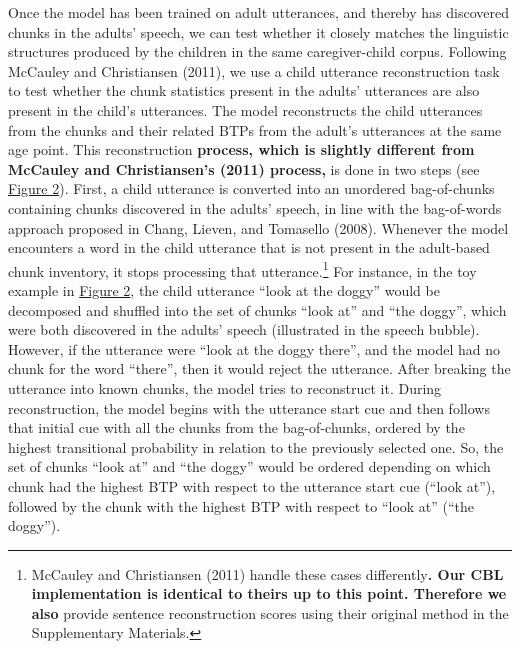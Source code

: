 \documentclass[man,mask,floatsintext]{apa6}
\let\rmarkdownfootnote\footnote%
\def\footnote{\protect\rmarkdownfootnote}
\begin{document}
Once the model has been trained on adult utterances, and thereby has
discovered chunks in the adults' speech, we can test whether it closely
matches the linguistic structures produced by the children in the same
caregiver-child corpus. Following McCauley and Christiansen (2011), we
use a child utterance reconstruction task to test whether the chunk
statistics present in the adults' utterances are also present in the
child's utterances. The model reconstructs the child utterances from the
chunks and their related BTPs from the adult's utterances at the same
age point. This reconstruction \textbf{process, which is slightly
different from McCauley and Christiansen's (2011) process,} is done in
two steps (see \protect\hyperlink{fig2}{Figure 2}). First, a child
utterance is converted into an unordered bag-of-chunks containing chunks
discovered in the adults' speech, in line with the bag-of-words approach
proposed in Chang, Lieven, and Tomasello (2008). Whenever the model
encounters a word in the child utterance that is not present in the
adult-based chunk inventory, it stops processing that
utterance.\footnote{McCauley and Christiansen (2011) handle these cases
  differently\textbf{. Our CBL implementation is identical to theirs up
  to this point. Therefore we also} provide sentence reconstruction
  scores using their original method in the Supplementary Materials.}
For instance, in the toy example in \protect\hyperlink{fig2}{Figure 2},
the child utterance \enquote{look at the doggy} would be decomposed and
shuffled into the set of chunks \enquote{look at} and \enquote{the
doggy}, which were both discovered in the adults' speech (illustrated in
the speech bubble). However, if the utterance were \enquote{look at the
doggy there}, and the model had no chunk for the word \enquote{there},
then it would reject the utterance. After breaking the utterance into
known chunks, the model tries to reconstruct it. During reconstruction,
the model begins with the utterance start cue and then follows that
initial cue with all the chunks from the bag-of-chunks, ordered by the
highest transitional probability in relation to the previously selected
one. So, the set of chunks \enquote{look at} and \enquote{the doggy}
would be ordered depending on which chunk had the highest BTP with
respect to the utterance start cue (\enquote{look at}), followed by the
chunk with the highest BTP with respect to \enquote{look at}
(\enquote{the doggy}).
\end{document}
